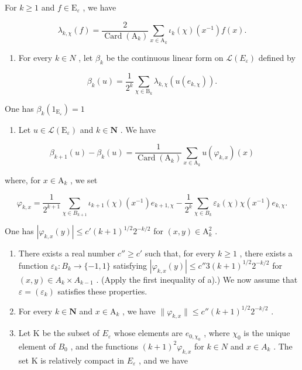 For \(k \geqslant 1\) and \(f \in \mathrm{E}_{\varepsilon}\) , we have

\[
\lambda_ {k, \chi} (f) = \frac {2}{\operatorname{Card} (\mathrm{A} _ {k})} \sum_ {x \in \mathrm{A} _ {k}} \iota_ {k} (\chi) (x ^ {- 1}) f (x).
\]

\begin{enumerate}
\def\labelenumi{\alph{enumi})}
\setcounter{enumi}{3}
\tightlist
\item
  For every \(k \in N\) , let \(\beta_{k}\) be the continuous linear form on \(\mathcal{L}(E_{\varepsilon})\) defined by
\end{enumerate}

\[
\beta_ {k} (u) = \frac {1}{2 ^ {k}} \sum_ {\chi \in \mathrm{B} _ {k}} \lambda_ {k, \chi} (u (e _ {k, \chi})).
\]

One has \(\beta_{k}(1_{\mathrm{E}_{\varepsilon}}) = 1\)

\begin{enumerate}
\def\labelenumi{\alph{enumi})}
\setcounter{enumi}{4}
\tightlist
\item
  Let \(u \in \mathcal{L}(\mathrm{E}_{\varepsilon})\) and \(k \in \mathbf{N}\) . We have
\end{enumerate}

\[
\beta_ {k + 1} (u) - \beta_ {k} (u) = \frac {1}{\operatorname{Card} \left(\mathrm{A} _ {k}\right)} \sum_ {x \in \mathrm{A} _ {k}} u \left(\varphi_ {k, x}\right) (x)
\]

where, for \(x \in \mathrm{A}_k\) , we set

\[
\varphi_ {k, x} = \frac {1}{2 ^ {k + 1}} \sum_ {\chi \in B _ {k + 1}} \iota_ {k + 1} (\chi) (x ^ {- 1}) e _ {k + 1, \chi} - \frac {1}{2 ^ {k}} \sum_ {\chi \in B _ {k}} \varepsilon_ {k} (\chi) \chi (x ^ {- 1}) e _ {k, \chi}.
\]

One has \(|\varphi_{k,x}(y)| \leqslant c'(k + 1)^{1/2}2^{-k/2}\) for \((x,y) \in \mathrm{A}_k^2\) .

\begin{enumerate}
\def\labelenumi{\alph{enumi})}
\setcounter{enumi}{5}
\item
  There exists a real number \(c'' \geqslant c'\) such that, for every \(k \geqslant 1\) , there exists a function \(\varepsilon_k \colon B_k \to \{-1,1\}\) satisfying \(|\varphi_{k,x}(y)| \leqslant c''3(k+1)^{1/2}2^{-k/2}\) for \((x,y) \in A_k \times A_{k-1}\) . (Apply the first inequality of a).) We now assume that \(\varepsilon = (\varepsilon_k)\) satisfies these properties.
\item
  For every \(k \in \mathbf{N}\) and \(x \in \mathrm{A}_k\) , we have \(\| \varphi_{k,x} \| \leqslant c''(k + 1)^{1/2} 2^{-k/2}\) .
\item
  Let K be the subset of \(E_{\varepsilon}\) whose elements are \(e_{0,\chi_{0}}\) , where \(\chi_{0}\) is the unique element of \(B_{0}\) , and the functions \((k+1)^{2}\varphi_{k,x}\) for \(k\in N\) and \(x\in A_{k}\) . The set K is relatively compact in \(E_{\varepsilon}\) , and we have
\end{enumerate}

